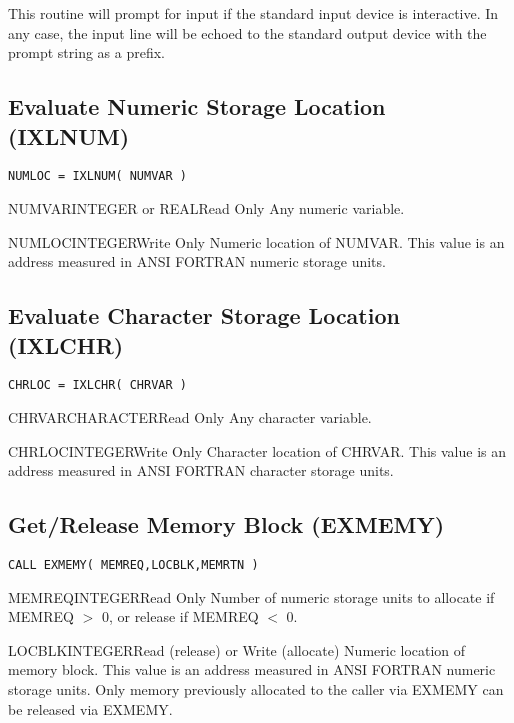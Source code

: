 This routine will prompt for input if the standard input device is
interactive.  In any case, the input line will be echoed to the standard
output device with the prompt string as a prefix.


\subsection{Evaluate Numeric Storage Location (IXLNUM)}

\verb+NUMLOC = IXLNUM( NUMVAR )+

\begin{argy}{NUMVAR}{INTEGER or REAL}{Read Only}
Any numeric variable.
\end{argy}

\begin{argy}{NUMLOC}{INTEGER}{Write Only}
Numeric location of NUMVAR.  This value is an address measured in ANSI
FORTRAN numeric storage units.
\end{argy}


\subsection{Evaluate Character Storage Location (IXLCHR)}

\verb+CHRLOC = IXLCHR( CHRVAR )+

\begin{argy}{CHRVAR}{CHARACTER}{Read Only}
Any character variable.
\end{argy}

\begin{argy}{CHRLOC}{INTEGER}{Write Only}
Character location of CHRVAR.  This value is an address measured in ANSI
FORTRAN character storage units.
\end{argy}


\subsection{Get/Release Memory Block (EXMEMY)} \label{sec:exmemy}

\verb+CALL EXMEMY( MEMREQ,LOCBLK,MEMRTN )+

\begin{argy}{MEMREQ}{INTEGER}{Read Only}
Number of numeric storage units to allocate if MEMREQ $>$ 0, or release if
MEMREQ $<$ 0.
\end{argy}

\begin{argy}{LOCBLK}{INTEGER}{Read (release) or Write (allocate)}
Numeric location of memory block.  This value is an address measured in ANSI
FORTRAN numeric storage units. Only memory previously allocated to the
caller via EXMEMY can be released via EXMEMY.
\end{argy}

